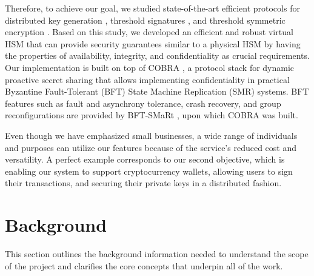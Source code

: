 \documentclass[runningheads]{llncs}
\begin{document}
Therefore, to achieve our goal, we studied state-of-the-art efficient protocols for distributed key generation \cite{dkgwild,cobra}, threshold signatures \cite{gennaro18,frost3,blsdraft}, and threshold symmetric encryption \cite{dise}. Based on this study, we developed an efficient and robust virtual HSM that can provide security guarantees similar to a physical HSM by having the properties of availability, integrity, and confidentiality as crucial requirements. Our implementation is built on top of COBRA \cite{cobra}, a protocol stack for dynamic proactive secret sharing that allows implementing confidentiality in practical Byzantine Fault-Tolerant (BFT) State Machine Replication (SMR) systems. BFT features such as fault and asynchrony tolerance, crash recovery, and group reconfigurations are provided by BFT-SMaRt \cite{bftsmart}, upon which COBRA was built.

Even though we have emphasized small businesses, a wide range of individuals and purposes can utilize our features because of the service's reduced cost and versatility. A perfect example corresponds to our second objective, which is enabling our system to support cryptocurrency wallets, allowing users to sign their transactions, and securing their private keys in a distributed fashion.


\section{Background} \label{sec:background}

This section outlines the background information needed to understand the scope of the project and clarifies the core concepts that underpin all of the work.
\end{document}
